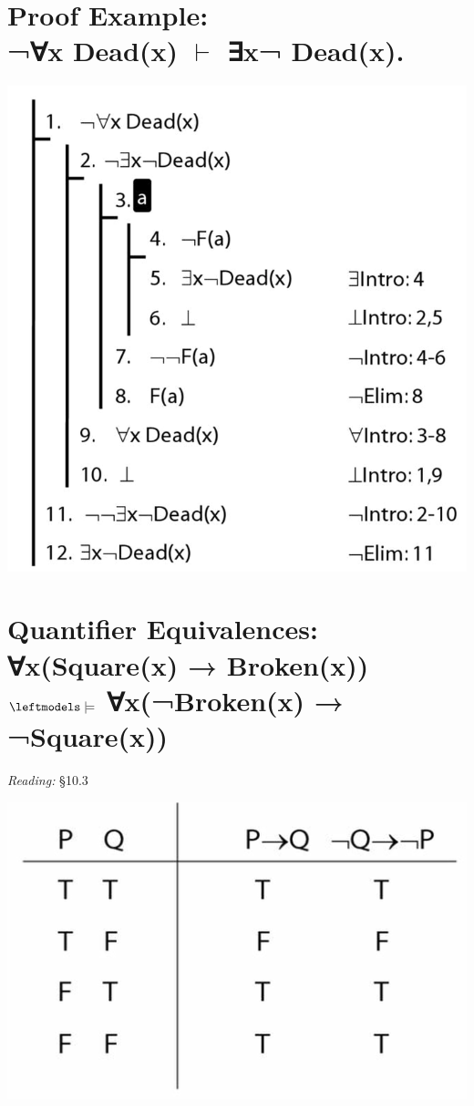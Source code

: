 \documentclass[12pt]{extarticle}
\begin{document}
\begin{multicols*}{3}
 
\section{Proof Example: \\ ¬∀x Dead(x) $\vdash$ ∃x¬ Dead(x).}
 
\begin{center}
\includegraphics[scale=0.3]{img/unit_826_proof.png}
\end{center}
 
 
\section{Quantifier Equivalences: \\ ∀x(Square(x) → Broken(x)) \\ $\leftmodels\models$ ∀x(¬Broken(x) → ¬Square(x))}
 
\emph{Reading:} §10.3
 
\begin{center}
\includegraphics[scale=0.3]{img/unit_760_tt.png}
\end{center}
 

\end{multicols*}
\end{document}
